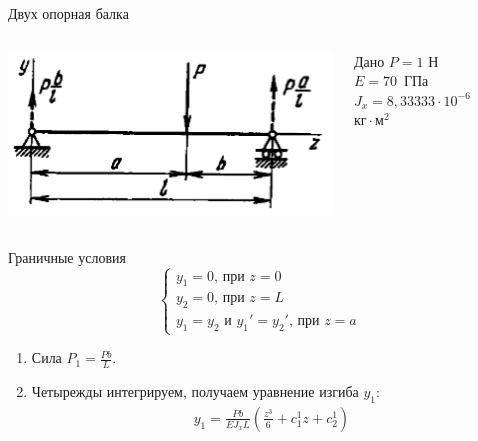 \documentclass[ignoreonframetext,unicode]{beamer}
\begin{document}
	\begin{frame}{Двух опорная балка}
	\begin{columns}
	\includegraphics[width=\textwidth]{pic.8}
	\begin{block}{Дано}
		$P = 1$ Н \\ 
		$E = 70$~ГПа\\
		$J_{x} = 8,33333 \cdot 10^{-6}$~$\mbox{кг} \cdot \mbox{м}^2$
	\end{block}
	\end{columns}

	\begin{block}{Граничные условия}
	\[
	\begin{cases}
		y_1 = 0 \mbox{, при } z = 0\\
		y_2 = 0 \mbox{, при } z = L\\
		y_1 = y_2 \mbox{ и } y_1' = y_2' \mbox{, при } z = a
	\end{cases}
	\]		
\end{block}

\begin{enumerate}
	\item  Сила $P_1 = \frac{P b}{L} $.
	
	\item 	Четырежды интегрируем, получаем уравнение изгиба $y_1$:
	\begin{gather*}
		y_1 = \frac{P b}{E J_{x} L} \left(\frac{z^3}{6} + c_1^1 z + c_2^1\right)
	\end{gather*}		
\end{enumerate}
	
\end{frame}
\end{document}
